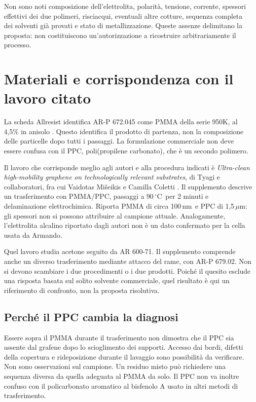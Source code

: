 \documentclass[11pt,reqno]{amsart}
\numberwithin{equation}{section}
\newcommand{\degC}{\ensuremath{^{\circ}\mathrm{C}}}
\newcommand{\um}{\ensuremath{\mu\mathrm{m}}}
\newcommand{\nm}{\ensuremath{\mathrm{nm}}}
\begin{document}
Non sono noti composizione dell'elettrolita, polarit\`a, tensione,
corrente, spessori effettivi dei due polimeri, risciacqui, eventuali altre
cotture, sequenza completa dei solventi gi\`a provati e stato di
metallizzazione. Queste assenze delimitano la proposta: non costituiscono
un'autorizzazione a ricostruire arbitrariamente il processo.

\section{Materiali e corrispondenza con il lavoro citato}

La scheda Allresist identifica AR-P 672.045 come PMMA della serie 950K,
al 4,5\% in anisolo \cite{Allresist}. Questo identifica il prodotto
di partenza, non la composizione delle particelle dopo tutti i passaggi.
La formulazione commerciale non deve essere confusa con il PPC,
poli(propilene carbonato), che \`e un secondo polimero.

Il lavoro che corrisponde meglio agli autori e alla procedura indicati
\`e \emph{Ultra-clean high-mobility graphene on technologically relevant
substrates}, di Tyagi e collaboratori, fra cui Vaidotas Mi\v{s}eikis
e Camilla Coletti \cite{Tyagi2022}. Il supplemento descrive un trasferimento
con PMMA/PPC, passaggi a 90\,\degC\ per 2 minuti e delaminazione
elettrochimica. Riporta PMMA di circa 100\,\nm\ e PPC di 1,5\,\um:
gli spessori non si possono attribuire al campione attuale. Analogamente,
l'elettrolita alcalino riportato dagli autori non \`e un dato confermato
per la cella usata da Armando.

Quel lavoro studia acetone seguito da AR 600-71. Il supplemento comprende
anche un diverso trasferimento mediante attacco del rame, con
AR-P 679.02. Non si devono scambiare i due procedimenti o i due prodotti.
Poich\'e il quesito esclude una risposta basata sul solito solvente
commerciale, quel risultato \`e qui un riferimento di confronto,
non la proposta risolutiva.

\subsection{Perch\'e il PPC cambia la diagnosi}
Essere sopra il PMMA durante il trasferimento non dimostra che il PPC
sia assente dal grafene dopo lo scioglimento dei supporti. Accesso dai
bordi, difetti della copertura e rideposizione durante il lavaggio sono
possibilit\`a da verificare. Non sono osservazioni sul campione.
Un residuo misto pu\`o richiedere una sequenza diversa da quella adeguata
al PMMA da solo. Il PPC non va inoltre confuso con il policarbonato
aromatico al bisfenolo A usato in altri metodi di trasferimento.
\end{document}
